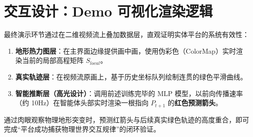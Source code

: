 \documentclass[a4paper,11pt]{ctexart}
\begin{document}
\section{交互设计：Demo 可视化渲染逻辑}

最终演示环节通过在二维视频流上叠加数据层，直观证明实体平台的系统有效性：
\begin{enumerate}
    \item \textbf{地形热力图层}：在主界面边缘提供画中画，使用伪彩色（ColorMap）实时渲染当前的局部高程矩阵 $S_{local}$。
    \item \textbf{真实轨迹层}：在视频流原画上，基于历史坐标队列绘制连贯的绿色平滑曲线。
    \item \textbf{智能推断层（高光设计）}：调用前述训练完毕的 MLP 模型，以前向传播速率（约 10Hz）在智能体头部实时渲染一根指向 $P_{t+1}$ 的\textbf{红色预测箭头}。
\end{enumerate}

通过肉眼观察物理地形突变时，预测红箭头与后续真实绿色轨迹的高度重合，即可完成“平台成功捕获物理世界交互规律”的闭环验证。
\end{document}

